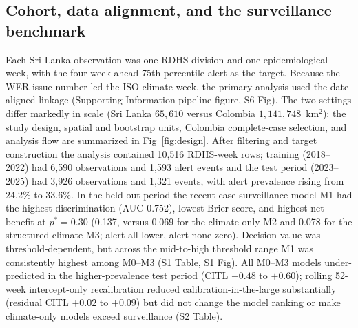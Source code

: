 \documentclass[11pt,a4paper]{article}
\begin{document}
\subsection{Cohort, data alignment, and the surveillance benchmark}
Each Sri Lanka observation was one RDHS division and one epidemiological week, with the four-week-ahead 75th-percentile alert as the target. Because the WER issue number led the ISO climate week, the primary analysis used the date-aligned linkage (Supporting Information pipeline figure, S6 Fig). The two settings differ markedly in scale (Sri Lanka $65{,}610$ versus Colombia $1{,}141{,}748$~km$^2$); the study design, spatial and bootstrap units, Colombia complete-case selection, and analysis flow are summarized in Fig~\ref{fig:design}. After filtering and target construction the analysis contained 10{,}516 RDHS-week rows; training (2018--2022) had 6{,}590 observations and 1{,}593 alert events and the test period (2023--2025) had 3{,}926 observations and 1{,}321 events, with alert prevalence rising from 24.2\% to 33.6\%. In the held-out period the recent-case surveillance model M1 had the highest discrimination (AUC 0.752), lowest Brier score, and highest net benefit at $p^*=0.30$ (0.137, versus 0.069 for the climate-only M2 and 0.078 for the structured-climate M3; alert-all lower, alert-none zero). Decision value was threshold-dependent, but across the mid-to-high threshold range M1 was consistently highest among M0--M3 (S1 Table, S1 Fig). All M0--M3 models under-predicted in the higher-prevalence test period (CITL $+0.48$ to $+0.60$); rolling 52-week intercept-only recalibration reduced calibration-in-the-large substantially (residual CITL $+0.02$ to $+0.09$) but did not change the model ranking or make climate-only models exceed surveillance (S2 Table).
\end{document}
